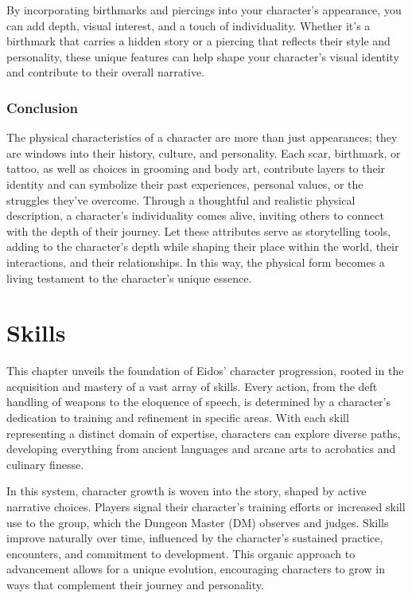 \documentclass[12pt]{book}
\begin{document}
By incorporating birthmarks and piercings into your character's appearance, you can add depth, visual interest, and a touch of individuality. Whether it's a birthmark that carries a hidden story or a piercing that reflects their style and personality, these unique features can help shape your character's visual identity and contribute to their overall narrative.

\subsection{\textbf{Conclusion}}

The physical characteristics of a character are more than just appearances; they are windows into their history, culture, and personality. Each scar, birthmark, or tattoo, as well as choices in grooming and body art, contribute layers to their identity and can symbolize their past experiences, personal values, or the struggles they’ve overcome. Through a thoughtful and realistic physical description, a character’s individuality comes alive, inviting others to connect with the depth of their journey. Let these attributes serve as storytelling tools, adding to the character’s depth while shaping their place within the world, their interactions, and their relationships. In this way, the physical form becomes a living testament to the character's unique essence.

\chapter{Skills}

This chapter unveils the foundation of Eidos' character progression, rooted in the acquisition and mastery of a vast array of skills. Every action, from the deft handling of weapons to the eloquence of speech, is determined by a character's dedication to training and refinement in specific areas. With each skill representing a distinct domain of expertise, characters can explore diverse paths, developing everything from ancient languages and arcane arts to acrobatics and culinary finesse. 

In this system, character growth is woven into the story, shaped by active narrative choices. Players signal their character’s training efforts or increased skill use to the group, which the Dungeon Master (DM) observes and judges. Skills improve naturally over time, influenced by the character’s sustained practice, encounters, and commitment to development. This organic approach to advancement allows for a unique evolution, encouraging characters to grow in ways that complement their journey and personality.
\end{document}

